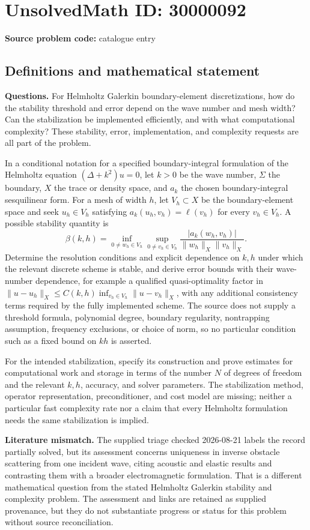 \documentclass[11pt]{article}
\begin{document}
\section*{UnsolvedMath ID: 30000092}
\textbf{Source problem code:} catalogue entry
\subsection{Definitions and mathematical statement}
\textbf{Questions.} For Helmholtz Galerkin boundary-element discretizations, how do the stability threshold and error depend on the wave number and mesh width? Can the stabilization be implemented efficiently, and with what computational complexity? These stability, error, implementation, and complexity requests are all part of the problem.\par In a conditional notation for a specified boundary-integral formulation of the Helmholtz equation \((\Delta+k^2)u=0\), let \(k>0\) be the wave number, \(\Sigma\) the boundary, \(X\) the trace or density space, and \(a_k\) the chosen boundary-integral sesquilinear form. For a mesh of width \(h\), let \(V_h\subset X\) be the boundary-element space and seek \(u_h\in V_h\) satisfying \(a_k(u_h,v_h)=\ell(v_h)\) for every \(v_h\in V_h\). A possible stability quantity is\[\beta(k,h)=\inf_{0\ne w_h\in V_h}\sup_{0\ne v_h\in V_h}\frac{|a_k(w_h,v_h)|}{\|w_h\|_X\|v_h\|_X}.\] Determine the resolution conditions and explicit dependence on \(k,h\) under which the relevant discrete scheme is stable, and derive error bounds with their wave-number dependence, for example a qualified quasi-optimality factor in \(\|u-u_h\|_X\le C(k,h)\inf_{v_h\in V_h}\|u-v_h\|_X\), with any additional consistency terms required by the fully implemented scheme. The source does not supply a threshold formula, polynomial degree, boundary regularity, nontrapping assumption, frequency exclusions, or choice of norm, so no particular condition such as a fixed bound on \(kh\) is asserted.\par For the intended stabilization, specify its construction and prove estimates for computational work and storage in terms of the number \(N\) of degrees of freedom and the relevant \(k,h\), accuracy, and solver parameters. The stabilization method, operator representation, preconditioner, and cost model are missing; neither a particular fast complexity rate nor a claim that every Helmholtz formulation needs the same stabilization is implied.\par \textbf{Literature mismatch.} The supplied triage checked 2026-08-21 labels the record partially solved, but its assessment concerns uniqueness in inverse obstacle scattering from one incident wave, citing acoustic and elastic results and contrasting them with a broader electromagnetic formulation. That is a different mathematical question from the stated Helmholtz Galerkin stability and complexity problem. The assessment and links are retained as supplied provenance, but they do not substantiate progress or status for this problem without source reconciliation.
\end{document}

